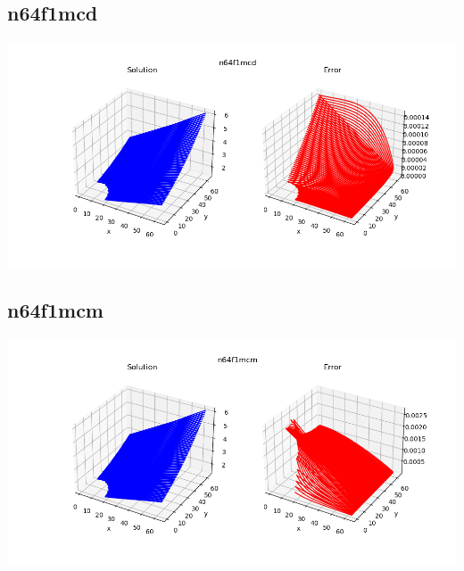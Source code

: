 \subsection*{n64f1mcd}
\includegraphics[scale=0.6]{../../image/n64f1mcd.png}
\subsection*{n64f1mcm}
\includegraphics[scale=0.6]{../../image/n64f1mcm.png}

